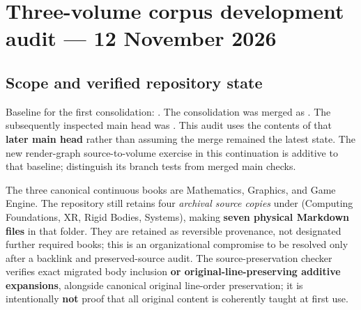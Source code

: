 \hypertarget{appendix-28e6f216fdc7}{}\label{referencestart:appendix-28e6f216fdc7}
\section{Three-volume corpus development audit --- 12 November 2026}\label{appendix-28e6f216fdc7-three-volume-corpus-development-audit-12-november-2026}

\hypertarget{appendix-28e6f216fdc7-three-volume-corpus-development-audit-12-november-2026}{}

\subsection{Scope and verified repository state}\label{appendix-28e6f216fdc7-scope-and-verified-repository-state}

\hypertarget{appendix-28e6f216fdc7-scope-and-verified-repository-state}{}

Baseline for the first consolidation: . The consolidation was merged as . The subsequently inspected main head was . This audit uses the contents of that \textbf{later main head} rather than assuming the merge remained the latest state. The new render-graph source-to-volume exercise in this continuation is additive to that baseline; distinguish its branch tests from merged main checks.

The three canonical continuous books are Mathematics, Graphics, and Game Engine. The repository still retains four \emph{archival source copies} under  (Computing Foundations, XR, Rigid Bodies, Systems), making \textbf{seven physical Markdown files} in that folder. They are retained as reversible provenance, not designated further required books; this is an organizational compromise to be resolved only after a backlink and preserved-source audit. The source-preservation checker verifies exact migrated body inclusion \textbf{or original-line-preserving additive expansions}, alongside canonical original line-order preservation; it is intentionally \textbf{not} proof that all original content is coherently taught at first use.

